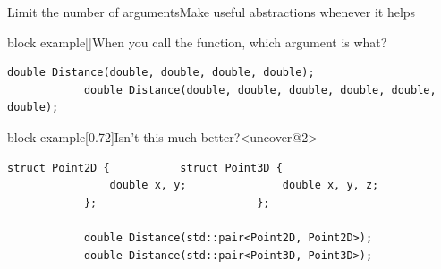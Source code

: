 \begin{frame}[fragile]{Limit the number of arguments}{Make useful abstractions whenever it helps}
    \begin{varblock}{block example}[\textwidth]{When you call the function, which argument is what?}
        \begin{lstlisting}[style=MyCpp]
            double Distance(double, double, double, double);
            double Distance(double, double, double, double, double, double);
        \end{lstlisting}
    \end{varblock}
    \vspace{-1mm}
    \begin{varblock}{block example}[0.72\textwidth]{Isn't this much better?}<uncover@2>
        \begin{lstlisting}[style=MyCpp]
            struct Point2D {           struct Point3D {
                double x, y;               double x, y, z;
            };                         };

            double Distance(std::pair<Point2D, Point2D>);
            double Distance(std::pair<Point3D, Point3D>);
        \end{lstlisting}
    \end{varblock}
\end{frame}


